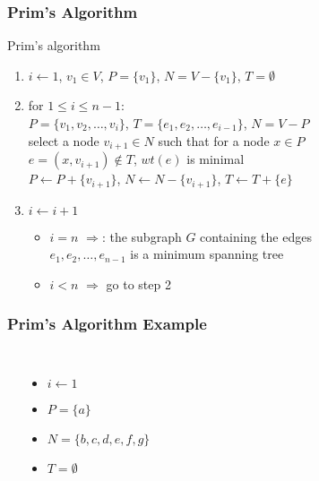 \documentclass[dvipsnames]{beamer}
\begin{document}
\begin{frame}
  \frametitle{Prim's Algorithm}

  \begin{block}{Prim's algorithm}
    \begin{enumerate}
      \item $i \leftarrow 1$, $v_1 \in V$, $P=\{v_1\}$, $N=V-\{v_1\}$,
        $T=\emptyset$

      \pause
      \item for $1 \leq i \leq n-1$:\\
        $P=\{v_1,v_2,\dots,v_i\}$, $T=\{e_1,e_2,\dots,e_{i-1}\}$, $N=V-P$\\
        select a node $v_{i+1} \in N$ such that for a node $x \in P$\\
        $e=(x,v_{i+1}) \notin T$, $wt(e)$ is minimal\\
        $P \leftarrow P+\{v_{i+1}\}$, $N \leftarrow N-\{v_{i+1}\}$,
        $T \leftarrow T+\{e\}$

      \pause
      \item $i \leftarrow i+1$
      \begin{itemize}
        \item $i=n$ $\Rightarrow$: the subgraph $G$ containing the edges\\
	  $e_1,e_2,\dots,e_{n-1}$ is a minimum spanning tree
        \item $i<n$ $\Rightarrow$ go to step 2

      \end{itemize}
    \end{enumerate}
  \end{block}
\end{frame}

\begin{frame}
  \frametitle{Prim's Algorithm Example}

  \begin{example}[initialization]
    \begin{columns}
      \begin{center}
      \end{center}

      \pause
      \begin{itemize}
        \item $i \leftarrow 1$
        \item $P = \{ a \}$
        \item $N = \{ b, c, d, e, f, g \}$
        \item $T = \emptyset$
      \end{itemize}
    \end{columns}
  \end{example}
\end{frame}
\end{document}
